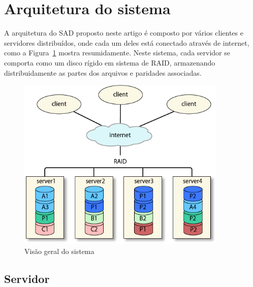 	\section{Arquitetura do sistema}
	
	A arquitetura do SAD proposto neste artigo é composto por vários clientes e servidores distribuídos, onde cada um deles está conectado através de internet, como a Figura~\ref{fig:vis_sis} mostra resumidamente. Neste sistema, cada servidor se comporta como um disco rígido em sistema de RAID, armazenando distribuidamente as partes dos arquivos e paridades associadas.
	
	

	
	
	\begin{figure}[htb]
		\begin{center}
			
			\includegraphics[clip,width=10.0cm]{images/image1.png}
			\caption{Visão geral do sistema}
			\label{fig:vis_sis}
		\end{center}
	\end{figure}
	
	
	
	\subsection{Servidor}
	
